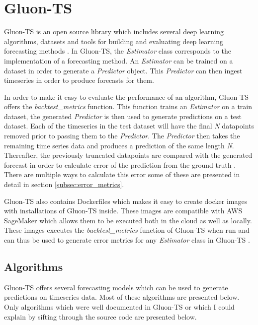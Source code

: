 \section{Gluon-TS}
\label{subsec:gluonts_overview}
Gluon-TS is an open source library which includes several deep learning algorithms, datasets and tools for building and evaluating deep learning forecasting methods \cite{gluonts-website,gluonts_paper,gluonts-github}. In Gluon-TS, the \textit{Estimator} class corresponds to the implementation of a forecasting method. An \textit{Estimator} can be trained on a dataset in order to generate a \textit{Predictor} object. This \textit{Predictor} can then ingest timeseries in order to produce forecasts for them.

In order to make it easy to evaluate the performance of an algorithm, Gluon-TS offers the \textit{backtest\_metrics} function. This function trains an \textit{Estimator} on a train dataset, the generated \textit{Predictor} is then used to generate predictions on a test dataset. Each of the timeseries in the test dataset will have the final \textit{N} datapoints removed prior to passing them to the \textit{Predictor}. The \textit{Predictor} then takes the remaining time series data and produces a prediction of the same length \textit{N}. Thereafter, the previously truncated datapoints are compared with the generated forecast in order to calculate error of the prediction from the ground truth \cite{gluonts-github}. There are multiple ways to calculate this error some of these are presented in detail in section \ref{subsec:error_metrics}.

Gluon-TS also contains Dockerfiles which makes it easy to create docker images with installations of Gluon-TS inside. These images are compatible with AWS SageMaker which allows them to be executed both in the cloud as well as locally. These images executes the \textit{backtest\_metrics} function of Gluon-TS when run and can thus be used to generate error metrics for any \textit{Estimator} class in Gluon-TS \cite{gluonts-github}.

\subsection{Algorithms}
\label{algorithms}
Gluon-TS offers several forecasting models which can be used to generate predictions on timeseries data. Most of these algorithms are presented below. Only algorithms which were well documented in Gluon-TS or which I could explain by sifting through the source code are presented below.

